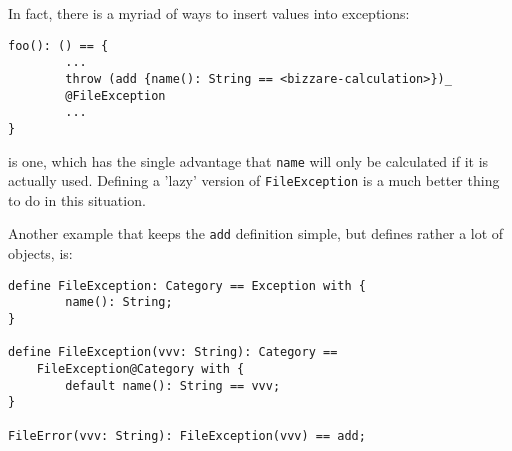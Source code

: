 In fact, there is a myriad of ways to insert values into exceptions:
\begin{small}
\begin{verbatim}
foo(): () == {
        ...
        throw (add {name(): String == <bizzare-calculation>})_
		@FileException
        ...
}
\end{verbatim}
\end{small} 

is one, which has the single advantage that {\tt name} will only
be calculated if it is actually used.  Defining a 'lazy' version of 
{\tt FileException} is a much better thing to do in this situation.


Another example that keeps the {\tt add} definition simple, but 
defines rather a lot of objects, is:

\begin{small}
\begin{verbatim}
define FileException: Category == Exception with {
        name(): String;
}

define FileException(vvv: String): Category == 
	FileException@Category with {
        default name(): String == vvv;
}

FileError(vvv: String): FileException(vvv) == add;

\end{verbatim}
\end{small}


